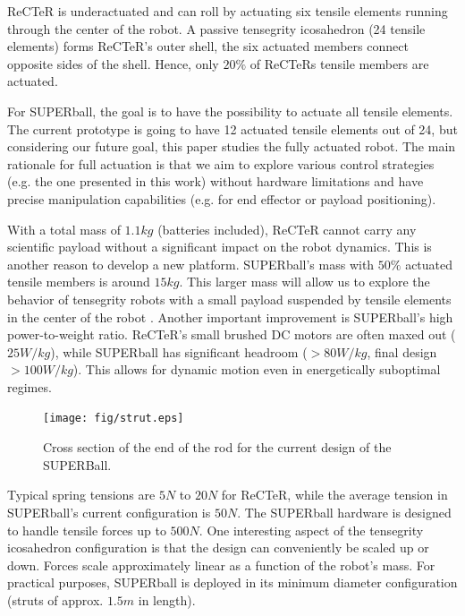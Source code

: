 \documentclass[twocolumn,10pt]{asme2ej}
\begin{document}
ReCTeR is underactuated and can roll by actuating six tensile elements running through the center of the robot.
A passive tensegrity icosahedron (24 tensile elements) forms ReCTeR's outer shell, the six actuated members connect opposite sides of the shell.
Hence, only $20\%$ of ReCTeRs tensile members are actuated. 

For SUPERball, the goal is to have the possibility to actuate all tensile elements. The current prototype is going to have 12 actuated tensile elements out of 24, but considering our future goal, this paper studies the fully actuated robot.
The main rationale for full actuation is that we aim to explore various control strategies (e.g. the one presented in this work) without hardware limitations and have precise manipulation capabilities (e.g. for end effector or payload positioning). 



With a total mass of $1.1kg$ (batteries included), ReCTeR cannot carry any scientific payload without a significant impact on the robot dynamics.
This is another reason to develop a new platform. SUPERball's mass with $50\%$ actuated tensile members is around $15kg$.
This larger mass will allow us to explore the behavior of tensegrity robots with a small payload suspended by tensile elements in the center of the robot \cite{Vytas_IPPW_2013}. 
Another important improvement is SUPERball's high power-to-weight ratio. 
ReCTeR's small brushed DC motors are often maxed out ($25W/kg$), while SUPERball has significant headroom ($>80W/kg$, final design $>100W/kg$).
This allows for dynamic motion even in energetically suboptimal regimes.

\begin{figure}[t]
   \centering
   \texttt{[image: fig/strut.eps]} 
   \caption{Cross section of the end of the rod for the current design of the SUPERBall.}
   \label{fig:SUPERBall}
\end{figure}


Typical spring tensions are $5N$ to $20N$ for ReCTeR, while the average tension in SUPERball's current configuration is $50N$.
The SUPERball hardware is designed to handle tensile forces up to $500N$.  
One interesting aspect of the tensegrity icosahedron configuration is that the design can conveniently be scaled up or down.
Forces scale approximately linear as a function of the robot's mass. 
For practical purposes, SUPERball is deployed in its minimum diameter configuration (struts of approx. $1.5m$ in length).
\end{document}
